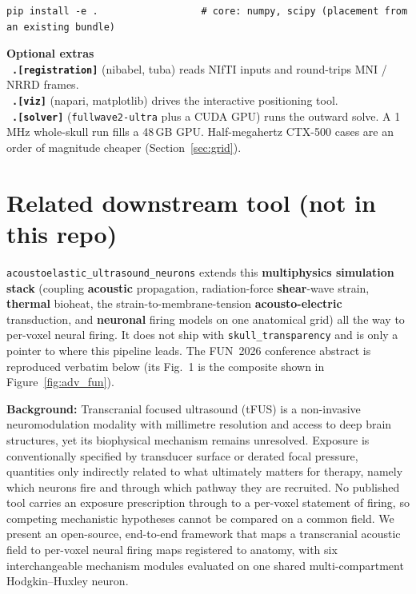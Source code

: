 \documentclass[10pt]{article}
\newcommand{\code}[1]{\lstinline[basicstyle=\ttfamily]|#1|}
\newcommand{\callout}[2]{%
  \begingroup\setlength{\fboxsep}{6pt}%
  \noindent\colorbox{notebg}{\parbox{\dimexpr\linewidth-2\fboxsep\relax}{%
    \textbf{#1}\\[1pt]\small #2}}\endgroup\par\vspace{2pt}}
\begin{document}
\begin{lstlisting}[style=sh]
pip install -e .                  # core: numpy, scipy (placement from an existing bundle)
\end{lstlisting}

\callout{Optional extras}{%
\textbullet\ \textbf{\code{.[registration]}} (nibabel, tuba) reads NIfTI inputs and
round-trips MNI / NRRD frames.\\
\textbullet\ \textbf{\code{.[viz]}} (napari, matplotlib) drives the interactive
positioning tool.\\
\textbullet\ \textbf{\code{.[solver]}} (\code{fullwave2-ultra} plus a CUDA GPU) runs the
outward solve. A 1\,MHz whole-skull run fills a 48\,GB GPU. Half-megahertz CTX-500 cases
are an order of magnitude cheaper (Section~\ref{sec:grid}).}

\newpage 
\section{Related downstream tool (not in this repo)}\label{sec:related}

\texttt{acoustoelastic\_ultrasound\_neurons} extends this \textbf{multiphysics simulation
stack} (coupling \textbf{acoustic} propagation, radiation-force \textbf{shear}-wave
strain, \textbf{thermal} bioheat, the strain-to-membrane-tension \textbf{acousto-electric}
transduction, and \textbf{neuronal} firing models on one anatomical grid) all the way
to per-voxel neural firing. It does not ship with \texttt{skull\_transparency} and is only
a pointer to where this pipeline leads. The FUN~2026 conference abstract is reproduced
verbatim below (its Fig.~1 is the composite shown in Figure~\ref{fig:adv_fun}).

\textbf{Background:} Transcranial focused ultrasound (tFUS) is a non-invasive
neuromodulation modality with millimetre resolution and access to deep brain structures,
yet its biophysical mechanism remains unresolved. Exposure is conventionally specified by
transducer surface or derated focal pressure, quantities only indirectly related to what
ultimately matters for therapy, namely which neurons fire and through which pathway they
are recruited. No published tool carries an exposure prescription through to a per-voxel
statement of firing, so competing mechanistic hypotheses cannot be compared on a common
field. We present an open-source, end-to-end framework that maps a transcranial acoustic
field to per-voxel neural firing maps registered to anatomy, with six interchangeable
mechanism modules evaluated on one shared multi-compartment Hodgkin--Huxley neuron.
\end{document}
